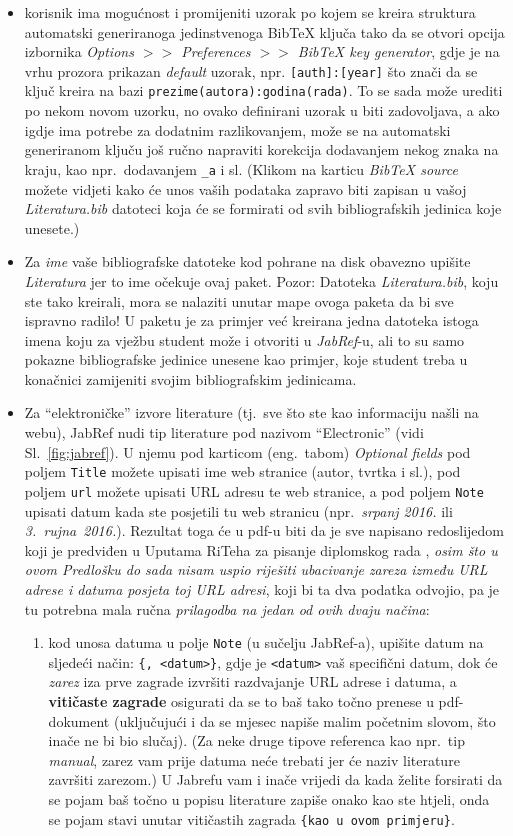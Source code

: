 \begin{itemize}
	\item korisnik ima mogućnost i promijeniti uzorak po kojem se kreira struktura automatski generiranoga jedinstvenoga BibTeX ključa tako da se otvori opcija izbornika \emph{Options $>>$ Preferences $>>$ BibTeX key generator}, gdje je na vrhu prozora prikazan \emph{default} uzorak, npr. \verb|[auth]:[year]| što znači da se ključ kreira na bazi \verb|prezime(autora):godina(rada)|. To se sada može urediti po nekom novom uzorku, no ovako definirani uzorak u biti zadovoljava, a ako igdje ima potrebe za dodatnim razlikovanjem, može se na automatski generiranom ključu još ručno napraviti korekcija dodavanjem nekog znaka na kraju, kao npr.\ dodavanjem \verb|_a| i sl. (Klikom na karticu \emph{BibTeX source} možete vidjeti kako će unos vaših podataka zapravo biti zapisan u vašoj \emph{Literatura.bib} datoteci koja će se formirati od svih bibliografskih jedinica koje unesete.)
	\item Za \emph{ime} vaše bibliografske datoteke kod pohrane na disk obavezno upišite  \emph{Literatura} jer to ime očekuje ovaj paket. Pozor: Datoteka \emph{Literatura.bib}, koju ste tako kreirali, mora se nalaziti unutar mape ovoga paketa da bi sve ispravno radilo! U paketu je za primjer već kreirana jedna datoteka istoga imena koju za vježbu student može i otvoriti u \emph{JabRef}-u, ali to su samo pokazne bibliografske jedinice unesene kao primjer, koje student treba u konačnici zamijeniti svojim bibliografskim jedinicama.
	\item Za ``elektroničke'' izvore literature (tj.\ sve što ste kao informaciju našli na webu), JabRef nudi tip literature pod nazivom ``Electronic'' (vidi Sl.~\ref{fig:jabref}). U njemu pod karticom (eng.\ tabom) \emph{Optional fields} pod poljem \verb|Title| možete upisati ime web stranice (autor, tvrtka i sl.), pod poljem \verb|url| možete upisati URL adresu te web stranice, a pod poljem \verb|Note| upisati datum kada ste posjetili tu web stranicu (npr.\ \emph{srpanj 2016.} ili \emph{3.~rujna~2016.}). Rezultat toga će u pdf-u biti da je sve napisano redoslijedom koji je predviđen u Uputama RiTeha za pisanje diplomskog rada \cite{riteh_upute}, \emph{osim što u ovom Predlošku do sada nisam uspio riješiti ubacivanje zareza između URL adrese i datuma posjeta toj URL adresi}, koji bi ta dva podatka odvojio, pa je tu potrebna mala ručna \emph{prilagodba na jedan od ovih dvaju načina}:
	\begin{enumerate}[label=\textbf{\roman*)}]
		\item kod unosa datuma u polje \verb|Note| (u sučelju JabRef-a), upišite datum na sljedeći način: \verb|{, <datum>}|, gdje je \verb|<datum>| vaš specifični datum, dok će \emph{zarez} iza prve zagrade izvršiti razdvajanje URL adrese i datuma, a \textbf{vitičaste zagrade} osigurati da se to baš tako točno prenese u pdf-dokument (uključujući i da se mjesec napiše malim početnim slovom, što inače ne bi bio slučaj). (Za neke druge tipove referenca kao npr.\ tip \emph{manual}, zarez vam prije datuma neće trebati jer će naziv literature završiti zarezom.) U Jabrefu vam i inače vrijedi da kada želite forsirati da se pojam baš točno u popisu literature zapiše onako kao ste htjeli, onda se pojam stavi unutar vitičastih zagrada \verb|{kao u ovom primjeru}|.

\end{enumerate}
\end{itemize}
